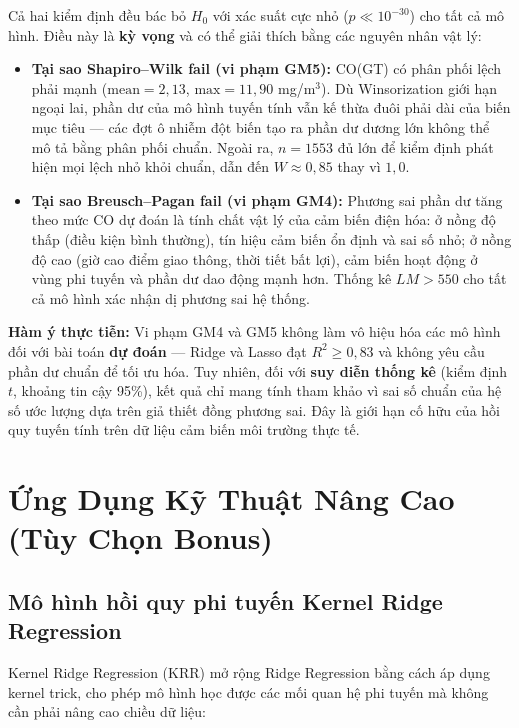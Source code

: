 \documentclass[12pt,a4paper]{report}
\begin{document}
Cả hai kiểm định đều bác bỏ $H_0$ với xác suất cực nhỏ ($p \ll 10^{-30}$) cho tất cả mô hình. Điều này là \textbf{kỳ vọng} và có thể giải thích bằng các nguyên nhân vật lý:

\begin{itemize}
    \item \textbf{Tại sao Shapiro--Wilk fail (vi phạm GM5):} CO(GT) có phân phối lệch phải mạnh ($\text{mean} = 2{,}13$, $\text{max} = 11{,}90$ mg/m$^3$). Dù Winsorization giới hạn ngoại lai, phần dư của mô hình tuyến tính vẫn kế thừa đuôi phải dài của biến mục tiêu --- các đợt ô nhiễm đột biến tạo ra phần dư dương lớn không thể mô tả bằng phân phối chuẩn. Ngoài ra, $n = 1553$ đủ lớn để kiểm định phát hiện mọi lệch nhỏ khỏi chuẩn, dẫn đến $W \approx 0{,}85$ thay vì $1{,}0$.

    \item \textbf{Tại sao Breusch--Pagan fail (vi phạm GM4):} Phương sai phần dư tăng theo mức CO dự đoán là tính chất vật lý của cảm biến điện hóa: ở nồng độ thấp (điều kiện bình thường), tín hiệu cảm biến ổn định và sai số nhỏ; ở nồng độ cao (giờ cao điểm giao thông, thời tiết bất lợi), cảm biến hoạt động ở vùng phi tuyến và phần dư dao động mạnh hơn. Thống kê $LM > 550$ cho tất cả mô hình xác nhận dị phương sai hệ thống.
\end{itemize}

\textbf{Hàm ý thực tiễn:} Vi phạm GM4 và GM5 không làm vô hiệu hóa các mô hình đối với bài toán \textbf{dự đoán} --- Ridge và Lasso đạt $R^2 \geq 0{,}83$ và không yêu cầu phần dư chuẩn để tối ưu hóa. Tuy nhiên, đối với \textbf{suy diễn thống kê} (kiểm định $t$, khoảng tin cậy 95\%), kết quả chỉ mang tính tham khảo vì sai số chuẩn của hệ số ước lượng dựa trên giả thiết đồng phương sai. Đây là giới hạn cố hữu của hồi quy tuyến tính trên dữ liệu cảm biến môi trường thực tế.

\section{Ứng Dụng Kỹ Thuật Nâng Cao (Tùy Chọn Bonus)}

\subsection{Mô hình hồi quy phi tuyến Kernel Ridge Regression}
 
Kernel Ridge Regression (KRR) mở rộng Ridge Regression bằng cách áp dụng kernel trick, cho phép mô hình học được các mối quan hệ phi tuyến mà không cần phải nâng cao chiều dữ liệu:
 
\end{document}
